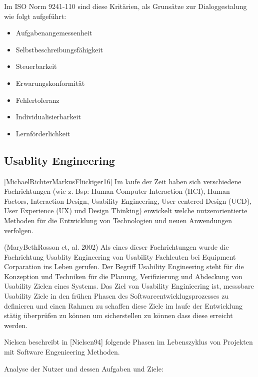 Im ISO Norm  9241-110 sind diese Kritärien, als Grunsätze zur Dialoggestalung wie folgt aufgeführt: %

\begin{itemize}
	\item Aufgabenangemessenheit
	\item Selbstbeschreibungsfähigkeit
	\item Steuerbarkeit
	\item Erwarungskonformität
	\item Fehlertoleranz
	\item Individualisierbarkeit
	\item Lernförderlichkeit
\end{itemize}



\subsection{Usablity Engineering}

[MichaelRichterMarkusFlückiger16]  Im laufe der Zeit haben sich verschiedene Fachrichtungen (wie z. Bsp: Human Computer Interaction (HCI), Human Factors, Interaction Design, Usability Engineering, 
User centered Design (UCD), User Experience (UX) und Design Thinking)  enwickelt welche nutzerorientierte Methoden für die Entwicklung von Technologien und neuen Anwendungen verfolgen. 

(MaryBethRosson et, al. 2002) Als eines dieser Fachrichtungen wurde die Fachrichtung Usablity Engineering von Usability Fachleuten bei Equipment Corparation ins Leben gerufen.  
Der Begriff Usability Engineering steht für die Konzeption und Techniken für die Planung, Verifizierung und Abdeckung von Usability Zielen eines Systems. Das Ziel von Usability Enginieering ist, 
messsbare Usability Ziele in den frühen Phasen des Softwareentwicklugsprozesses zu definieren und einen Rahmen zu schaffen diese Ziele im laufe der Entwicklung stätig überprüfen zu können 
um sicherstellen zu können dass diese erreicht werden.

Nielsen beschreibt in [Nielsen94] folgende Phasen im Lebenszyklus von Projekten mit Software Engenieering Methoden.

Analyse der Nutzer und dessen Aufgaben und Ziele:  

